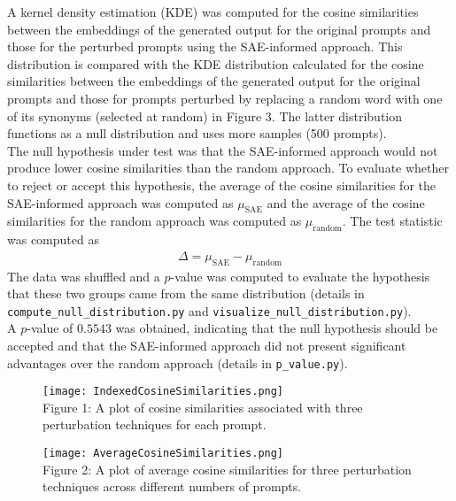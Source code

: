 \documentclass{article}
\begin{document}
A kernel density estimation (KDE) was computed for the cosine similarities between the embeddings of the generated output for the original prompts and those for the perturbed prompts using the SAE-informed approach. This distribution is compared with the KDE distribution calculated for the cosine similarities between the embeddings of the generated output for the original prompts and those for prompts perturbed by replacing a random word with one of its synonyms (selected at random) in Figure 3. The latter distribution functions as a null distribution and uses more samples (500 prompts).\\

The null hypothesis under test was that the SAE-informed approach would not produce lower cosine similarities than the random approach. To evaluate whether to reject or accept this hypothesis, the average of the cosine similarities for the SAE-informed approach was computed as $\mu_{\text{SAE}}$ and the average of the cosine similarities for the random approach was computed as $\mu_{\text{random}}$. The test statistic was computed as 
\begin{align*}
\Delta = \mu_{\text{SAE}} - \mu_{\text{random}}
\end{align*}
The data was shuffled and a $p$-value was computed to evaluate the hypothesis that these two groups came from the same distribution (details in \texttt{compute\_null\_distribution.py} and \texttt{visualize\_null\_distribution.py}).\\

A $p$-value of $0.5543$ was obtained, indicating that the null hypothesis should be accepted and that the SAE-informed approach did not present significant advantages over the random approach (details in \texttt{p\_value.py}).\\ 

\begin{figure} \centering
        \texttt{[image: IndexedCosineSimilarities.png]}
        \label{fig:IndexedCosineSimilarities}
        \centering
        \scriptsize
    \\Figure 1: A plot of cosine similarities associated with three perturbation techniques for each prompt.
\end{figure}

\begin{figure} \centering
        \texttt{[image: AverageCosineSimilarities.png]}
        \label{fig:AverageCosineSimilarities}
        \centering
        \scriptsize
    \\Figure 2: A plot of average cosine similarities for three perturbation techniques across different numbers of prompts.
\end{figure}
\end{document}

